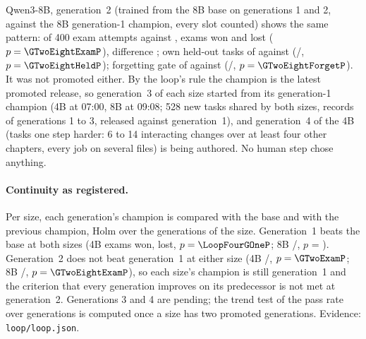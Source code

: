 Qwen3-8B, generation~2 (trained from the 8B base on generations 1 and 2, against the 8B generation-1 champion, every slot
counted) shows the same pattern: \GTwoEightExam{} of 400 exam attempts against \GTwoEightChampExam{}, \GTwoEightExamWins{}
exams won and \GTwoEightExamLosses{} lost ($p=\GTwoEightExamP$), difference \GTwoEightExamDiff; own held-out tasks
\GTwoEightHeld{} of \GTwoEightHeldAttempts{} against \GTwoEightChampHeld{} (\GTwoEightHeldWins{}/\GTwoEightHeldLosses{},
$p=\GTwoEightHeldP$); forgetting gate \GTwoEightForget{} of \GTwoEightForgetAttempts{} against \GTwoEightChampForget{}
(\GTwoEightForgetWins{}/\GTwoEightForgetLosses{}, $p=\GTwoEightForgetP$). It was not promoted either. By the loop's rule the
champion is the latest promoted release, so generation~3 of each size started from its generation-1 champion (4B at 07:00, 8B
at 09:08; 528 new tasks shared by both sizes, records of generations 1 to 3, released against generation~1), and generation~4
of the 4B (tasks one step harder: 6 to 14 interacting changes over at least four other chapters, every job on several files)
is being authored. No human step chose anything.

\paragraph{Continuity as registered.} Per size, each generation's champion is compared with the base and with the previous
champion, Holm over the generations of the size. Generation~1 beats the base at both sizes (4B \LoopFourGOneWins{} exams won,
\LoopFourGOneLosses{} lost, $p=\LoopFourGOneP$; 8B \LoopEightGOneWins{}/\LoopEightGOneLosses{}, $p$ = \LoopEightGOneP).
Generation~2 does not beat generation~1 at either size (4B \GTwoExamWins{}/\GTwoExamLosses{}, $p=\GTwoExamP$; 8B
\GTwoEightExamWins{}/\GTwoEightExamLosses{}, $p=\GTwoEightExamP$), so each size's champion is still generation~1 and the
criterion that every generation improves on its predecessor is not met at generation~2. Generations 3 and 4 are pending; the
trend test of the pass rate over generations is computed once a size has two promoted generations. Evidence: \nolinkurl{loop/loop.json}.

